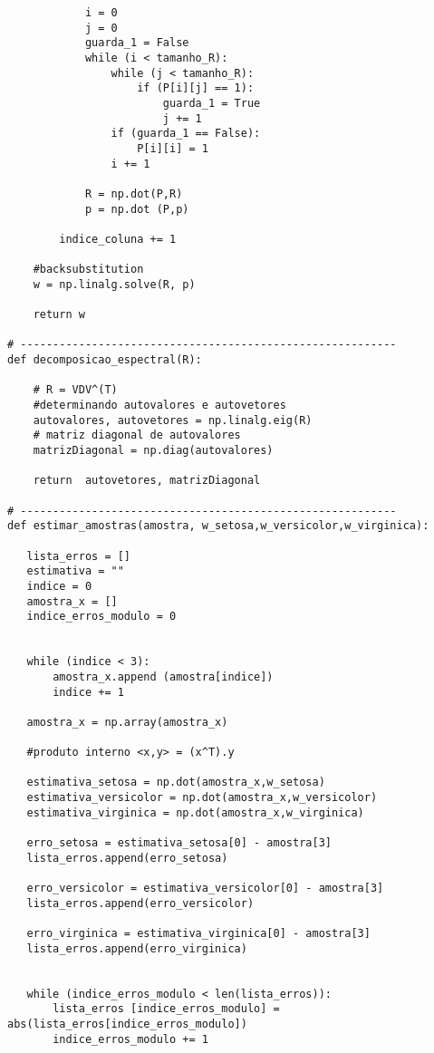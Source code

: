 \documentclass[a4paper,12pt,twoside]{article}
\begin{document}
\begin{lstlisting}
            i = 0
            j = 0
            guarda_1 = False
            while (i < tamanho_R):
                while (j < tamanho_R):
                    if (P[i][j] == 1):
                        guarda_1 = True
                        j += 1
                if (guarda_1 == False):
                    P[i][i] = 1
                i += 1
            
            R = np.dot(P,R)
            p = np.dot (P,p)
       
        indice_coluna += 1 
    
    #backsubstitution
    w = np.linalg.solve(R, p)
      
    return w
           
# ----------------------------------------------------------
def decomposicao_espectral(R):
    
    # R = VDV^(T)
    #determinando autovalores e autovetores
    autovalores, autovetores = np.linalg.eig(R) 
    # matriz diagonal de autovalores
    matrizDiagonal = np.diag(autovalores) 
    
    return  autovetores, matrizDiagonal

# ----------------------------------------------------------
def estimar_amostras(amostra, w_setosa,w_versicolor,w_virginica):
    
   lista_erros = []
   estimativa = ""
   indice = 0
   amostra_x = []
   indice_erros_modulo = 0
   
   
   while (indice < 3):
       amostra_x.append (amostra[indice])
       indice += 1
       
   amostra_x = np.array(amostra_x)

   #produto interno <x,y> = (x^T).y
   
   estimativa_setosa = np.dot(amostra_x,w_setosa)
   estimativa_versicolor = np.dot(amostra_x,w_versicolor)
   estimativa_virginica = np.dot(amostra_x,w_virginica)
   
   erro_setosa = estimativa_setosa[0] - amostra[3]
   lista_erros.append(erro_setosa)
   
   erro_versicolor = estimativa_versicolor[0] - amostra[3]
   lista_erros.append(erro_versicolor)
   
   erro_virginica = estimativa_virginica[0] - amostra[3]
   lista_erros.append(erro_virginica)
   
   
   while (indice_erros_modulo < len(lista_erros)):
       lista_erros [indice_erros_modulo] = abs(lista_erros[indice_erros_modulo])
       indice_erros_modulo += 1
   

\end{lstlisting}
\end{document}
